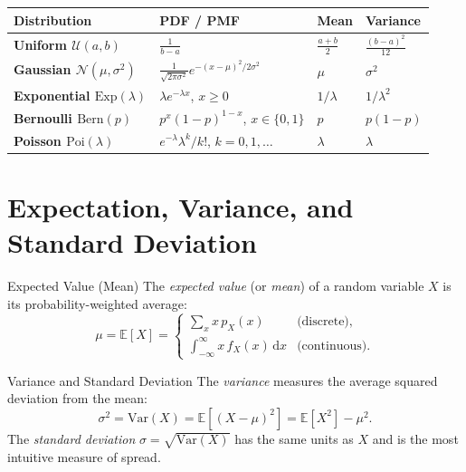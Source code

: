 \begin{center}
\renewcommand{\arraystretch}{1.3}
\begin{tabular}{>{\bfseries\sffamily\small}l >{\small}l >{\small}l >{\small}l}
\toprule
Distribution & PDF / PMF & Mean & Variance \\
\midrule
Uniform $\mathcal{U}(a,b)$ &
  $\tfrac{1}{b-a}$ &
  $\tfrac{a+b}{2}$ &
  $\tfrac{(b-a)^2}{12}$ \\
Gaussian $\mathcal{N}(\mu,\sigma^2)$ &
  $\tfrac{1}{\sqrt{2\pi\sigma^2}}e^{-(x-\mu)^2/2\sigma^2}$ &
  $\mu$ & $\sigma^2$ \\
Exponential $\mathrm{Exp}(\lambda)$ &
  $\lambda e^{-\lambda x}$, $x\geq0$ &
  $1/\lambda$ & $1/\lambda^2$ \\
Bernoulli $\mathrm{Bern}(p)$ &
  $p^x(1-p)^{1-x}$, $x\in\{0,1\}$ &
  $p$ & $p(1-p)$ \\
Poisson $\mathrm{Poi}(\lambda)$ &
  $e^{-\lambda}\lambda^k/k!$, $k=0,1,\ldots$ &
  $\lambda$ & $\lambda$ \\
\bottomrule
\end{tabular}
\end{center}

\section{Expectation, Variance, and Standard Deviation}
\label{sec:app_moments}

\begin{defnbox}{Expected Value (Mean)}
The \emph{expected value} (or \emph{mean}) of a random variable
$X$ is its probability-weighted average:
\[
  \mu = \mathbb{E}[X] =
  \begin{cases}
    \displaystyle\sum_x x\,p_X(x) & \text{(discrete)}, \\[6pt]
    \displaystyle\int_{-\infty}^{\infty} x\,f_X(x)\,\mathrm{d}x &
    \text{(continuous)}.
  \end{cases}
\]
\end{defnbox}

\begin{defnbox}{Variance and Standard Deviation}
The \emph{variance} measures the average squared deviation from the
mean:
\[
  \sigma^2 = \mathrm{Var}(X) = \mathbb{E}\!\left[(X-\mu)^2\right]
           = \mathbb{E}[X^2] - \mu^2.
\]
The \emph{standard deviation} $\sigma = \sqrt{\mathrm{Var}(X)}$ has
the same units as $X$ and is the most intuitive measure of spread.
\end{defnbox}

